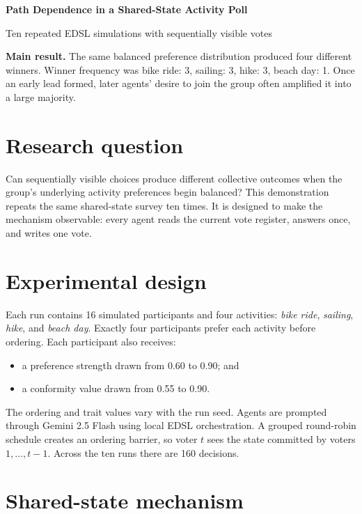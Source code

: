 \documentclass[11pt]{article}
\begin{document}
{\color{navy}\LARGE\bfseries Path Dependence in a Shared-State Activity Poll}

\vspace{0.4em}
{\Large Ten repeated EDSL simulations with sequentially visible votes}

\vspace{1.2em}
\colorbox{panel}{\parbox{0.94\linewidth}{
\textbf{Main result.} The same balanced preference distribution produced four different
winners. Winner frequency was bike ride: 3, sailing: 3, hike: 3, beach day: 1. Once an early lead formed,
later agents' desire to join the group often amplified it into a large majority.
}}

\section*{Research question}

Can sequentially visible choices produce different collective outcomes when the group's
underlying activity preferences begin balanced? This demonstration repeats the same
shared-state survey ten times. It is designed to make the mechanism observable: every
agent reads the current vote register, answers once, and writes one vote.

\section*{Experimental design}

Each run contains 16 simulated participants and four activities: \textit{bike ride},
\textit{sailing}, \textit{hike}, and \textit{beach day}. Exactly four participants
prefer each activity before ordering. Each participant also receives:

\begin{itemize}
  \item a preference strength drawn from 0.60 to 0.90; and
  \item a conformity value drawn from 0.55 to 0.90.
\end{itemize}

The ordering and trait values vary with the run seed. Agents are prompted through
Gemini 2.5 Flash using local EDSL orchestration. A grouped round-robin schedule creates
an ordering barrier, so voter $t$ sees the state committed by voters $1,\ldots,t-1$.
Across the ten runs there are 160 decisions.

\section*{Shared-state mechanism}
\end{document}
